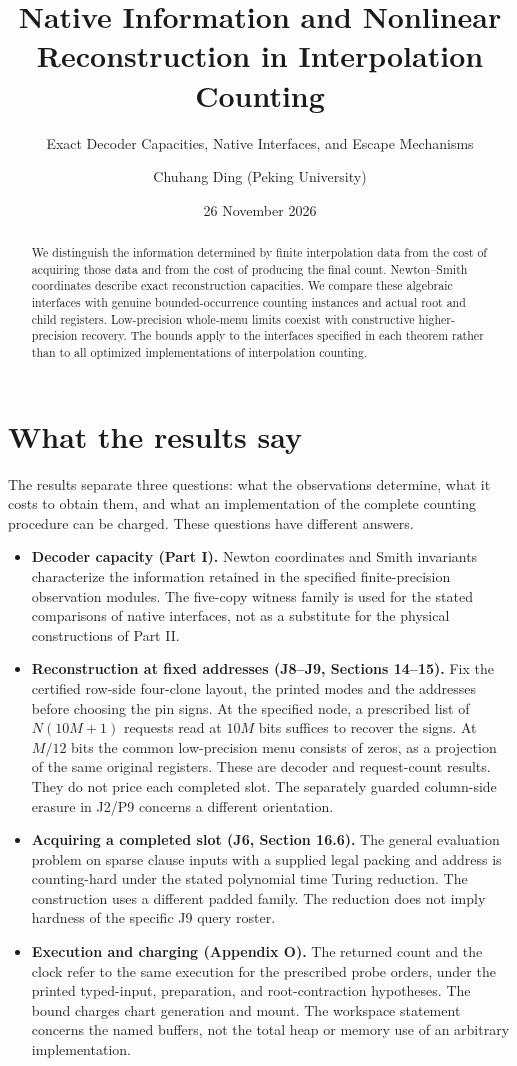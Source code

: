 \documentclass[
  11pt,
]{article}
\title{Native Information and Nonlinear Reconstruction in Interpolation Counting}
\subtitle{Exact Decoder Capacities, Native Interfaces, and Escape Mechanisms}
\author{Chuhang Ding (Peking University)}
\date{26 November 2026}
\begin{document}
\maketitle
\begin{abstract}
We distinguish the information determined by finite interpolation data from
the cost of acquiring those data and from the cost of producing the final
count. Newton--Smith coordinates describe exact reconstruction capacities.
We compare these algebraic interfaces with genuine bounded-occurrence
counting instances and actual root and child registers. Low-precision
whole-menu limits coexist with constructive higher-precision recovery.
The bounds apply to the interfaces specified in each theorem rather than
to all optimized implementations of interpolation counting.
\end{abstract}


\section*{What the results say}
The results separate three questions: what the observations determine,
what it costs to obtain them, and what an implementation of the complete
counting procedure can be charged. These questions have different answers.

\begin{itemize}
\item \textbf{Decoder capacity (Part I).}
  Newton coordinates and Smith invariants characterize the information
  retained in the specified finite-precision observation modules. The
  five-copy witness family is used for the stated comparisons of native
  interfaces, not as a substitute for the physical constructions of Part II.
\item \textbf{Reconstruction at fixed addresses (J8--J9, Sections 14--15).}
  Fix the certified row-side four-clone layout, the printed modes and the
  addresses before choosing the pin signs. At the specified node, a
  prescribed list of \(N(10M+1)\) requests read at \(10M\) bits suffices to
  recover the signs. At \(M/12\) bits the common low-precision menu consists
  of zeros, as a projection of the same original registers. These are
  decoder and request-count results. They do not price each completed
  slot. The separately guarded column-side erasure in J2/P9 concerns a
  different orientation.
\item \textbf{Acquiring a completed slot (J6, Section 16.6).}
  The general evaluation problem on sparse clause inputs with a supplied
  legal packing and address is counting-hard under the stated polynomial
  time Turing reduction. The construction uses a different padded family.
  The reduction does not imply hardness of the specific J9 query roster.
\item \textbf{Execution and charging (Appendix O).}
  The returned count and the clock refer to the same execution for the
  prescribed probe orders, under the printed typed-input, preparation,
  and root-contraction hypotheses. The bound charges chart generation and
  mount. The workspace statement concerns the named buffers, not the
  total heap or memory use of an arbitrary implementation.
\end{itemize}
\end{document}
